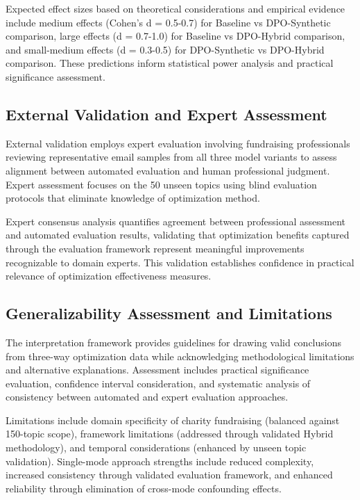 Expected effect sizes based on theoretical considerations and empirical evidence include medium effects (Cohen's d = 0.5-0.7) for Baseline vs DPO-Synthetic comparison, large effects (d = 0.7-1.0) for Baseline vs DPO-Hybrid comparison, and small-medium effects (d = 0.3-0.5) for DPO-Synthetic vs DPO-Hybrid comparison. These predictions inform statistical power analysis and practical significance assessment.

\subsection{External Validation and Expert Assessment}

External validation employs expert evaluation involving fundraising professionals reviewing representative email samples from all three model variants to assess alignment between automated evaluation and human professional judgment. Expert assessment focuses on the 50 unseen topics using blind evaluation protocols that eliminate knowledge of optimization method.

Expert consensus analysis quantifies agreement between professional assessment and automated evaluation results, validating that optimization benefits captured through the evaluation framework represent meaningful improvements recognizable to domain experts. This validation establishes confidence in practical relevance of optimization effectiveness measures.

\subsection{Generalizability Assessment and Limitations}

The interpretation framework provides guidelines for drawing valid conclusions from three-way optimization data while acknowledging methodological limitations and alternative explanations. Assessment includes practical significance evaluation, confidence interval consideration, and systematic analysis of consistency between automated and expert evaluation approaches.

Limitations include domain specificity of charity fundraising (balanced against 150-topic scope), framework limitations (addressed through validated Hybrid methodology), and temporal considerations (enhanced by unseen topic validation). Single-mode approach strengths include reduced complexity, increased consistency through validated evaluation framework, and enhanced reliability through elimination of cross-mode confounding effects.

